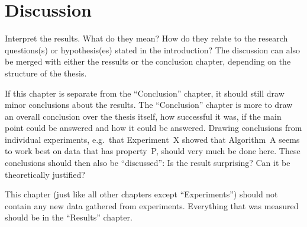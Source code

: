 \chapter{Discussion}\label{chap:discussion}

Interpret the results.
What do they mean?
How do they relate to the research questions(s) or hypothesis(es) stated in the introduction?
The discussion can also be merged with either the ressults or the conclusion chapter, depending on the structure of the thesis.

If this chapter is separate from the ``Conclusion'' chapter, it should still draw minor conclusions about the results.
The ``Conclusion'' chapter is more to draw an overall conclusion over the thesis itself, how successful it was, if the main point could be answered and how it could be answered.
Drawing conclusions from individual experiments, e.g.\ that Experiment~X showed that Algorithm~A seems to work best on data that has property~P, should very much be done here.
These conclusions should then also be ``discussed'':
Is the result surprising?
Can it be theoretically justified?

This chapter (just like all other chapters except ``Experiments'') should not contain any new data gathered from experiments.
Everything that was measured should be in the ``Results'' chapter.